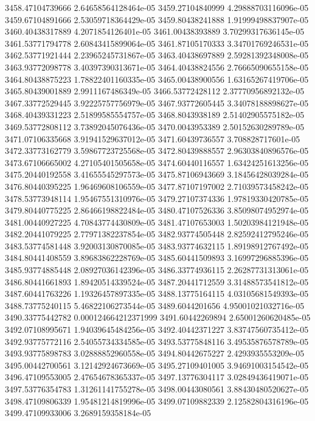 {3458.47104739666 2.64658564128464e-05
3459.27104840999 4.29888703116096e-05
3459.67104891666 2.53059718364429e-05
3459.80438241888 1.91999498837907e-05
3460.40438317889 4.2071854126401e-05
3461.00438393889 3.70299317636145e-05
3461.53771794778 2.60843415899064e-05
3461.87105170333 3.34701769246531e-05
3462.53771921444 2.23965245731867e-05
3463.40438697889 2.59281392348008e-05
3463.93772098778 3.40397390313671e-05
3464.40438824556 2.76665090655158e-05
3464.80438875223 1.78822401160335e-05
3465.00438900556 1.63165267419706e-05
3465.80439001889 2.9911167486349e-05
3466.53772428112 2.37770956892132e-05
3467.33772529445 3.92225757756979e-05
3467.93772605445 3.34078188898627e-05
3468.40439331223 2.51899585554757e-05
3468.8043938189 2.51402905575182e-05
3469.53772808112 3.73892045076436e-05
3470.0043953389 2.50152630289789e-05
3471.07106335668 3.91941529637012e-05
3471.60439736557 3.708828717601e-05
3472.33773162779 3.59867723725568e-05
3472.80439888557 2.96303840896576e-05
3473.67106665002 4.27105401505658e-05
3474.60440116557 1.63424251613256e-05
3475.20440192558 3.41655545297573e-05
3475.87106943669 3.18456428039284e-05
3476.80440395225 1.96469608106559e-05
3477.87107197002 2.71039573458242e-05
3478.53773948114 1.95467551310976e-05
3479.27107374336 1.97819330420785e-05
3479.80440775225 2.86466198822484e-05
3480.47107526336 3.85098074952974e-05
3481.00440927225 4.70843774430809e-05
3481.47107653003 1.50203984121948e-05
3482.20441079225 2.77971382237854e-05
3482.93774505448 2.82592412795246e-05
3483.53774581448 3.92003130870085e-05
3483.93774632115 1.89198912767492e-05
3484.80441408559 3.89683862228769e-05
3485.60441509893 3.16997296885396e-05
3485.93774885448 2.08927036142396e-05
3486.33774936115 2.26287731313061e-05
3486.80441661893 1.89420514339524e-05
3487.20441712559 3.31488573541812e-05
3487.60441763226 1.19326457897335e-05
3488.13775164115 4.03105681549393e-05
3488.73775240115 5.46822106273544e-05
3489.6044201656 4.95001021032716e-05
3490.33775442782 0.000124664212371999
3491.60442269894 2.65001260620485e-05
3492.07108995671 1.94039645484256e-05
3492.40442371227 3.83747560735412e-05
3492.93775772116 2.54055734334585e-05
3493.53775848116 3.49535876578789e-05
3493.93775898783 3.02888852960558e-05
3494.80442675227 2.4293935553209e-05
3495.00442700561 3.12142924673669e-05
3495.27109401005 3.94691003154542e-05
3496.47109553005 2.47654678365337e-05
3497.13776304117 3.02849436419071e-05
3497.53776354783 1.31261141755278e-05
3498.00443080561 3.88430480520627e-05
3498.47109806339 1.95481214819996e-05
3499.07109882339 2.12582804316196e-05
3499.47109933006 3.2689159358184e-05
}
